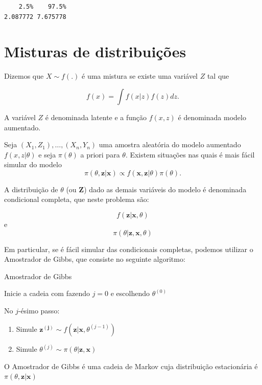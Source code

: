 \documentclass[
  letterpaper,
  DIV=11,
  numbers=noendperiod]{scrreprt}
\theoremstyle{definition}
\theoremstyle{definition}
\theoremstyle{remark}
\begin{document}
\begin{verbatim}
    2.5%    97.5% 
2.087772 7.675778 
\end{verbatim}


\hypertarget{misturas-de-distribuiuxe7uxf5es}{%
\chapter{Misturas de
distribuições}\label{misturas-de-distribuiuxe7uxf5es}}

Dizemos que \(X\sim f(.)\) é uma mistura se existe uma variável \(Z\)
tal que

\[f(x)=\int f(x|z)f(z)dz.\]

A variável \(Z\) é denominada latente e a função \(f(x,z)\) é denominada
modelo aumentado.

Seja \((X_1,Z_1),\ldots,(X_n,Y_n)\) uma amostra aleatória do modelo
aumentado \(f(x,z|\theta)\) e seja \(\pi(\theta)\) a priori para
\(\theta\). Existem situações nas quais é mais fácil simular do modelo
\[\pi(\theta,\boldsymbol{z}|\boldsymbol{x})\varpropto f(\boldsymbol{x},\boldsymbol{z}|\theta)\pi(\theta).\]

A distribuição de \(\theta\) (ou \(\boldsymbol{Z}\)) dado as demais
variáveis do modelo é denominada condicional completa, que neste
problema são:

\[f(\boldsymbol{z}|\boldsymbol{x},\theta)\] e
\[\pi(\theta|\boldsymbol{z},\boldsymbol{x},\theta)\]

Em particular, se é fácil simular das condicionais completas, podemos
utilizar o Amostrador de Gibbs, que consiste no seguinte algoritmo:

Amostrador de Gibbs

Inicie a cadeia com fazendo \(j=0\) e escolhendo \(\theta^{(0)}\)

No \(j\)-ésimo passo:

\begin{enumerate}
\def\labelenumi{\arabic{enumi}.}
\item
  Simule
  \(\boldsymbol{z^{(j)}}\sim f(\boldsymbol{z}|\boldsymbol{x},\theta^{(j-1)})\)
\item
  Simule \(\theta^{(j)}\sim \pi(\theta|\boldsymbol{z},\boldsymbol{x})\)
\end{enumerate}

O Amostrador de Gibbs é uma cadeia de Markov cuja distribuição
estacionária é \(\pi(\theta,\boldsymbol{z}|\boldsymbol{x})\)
\end{document}
